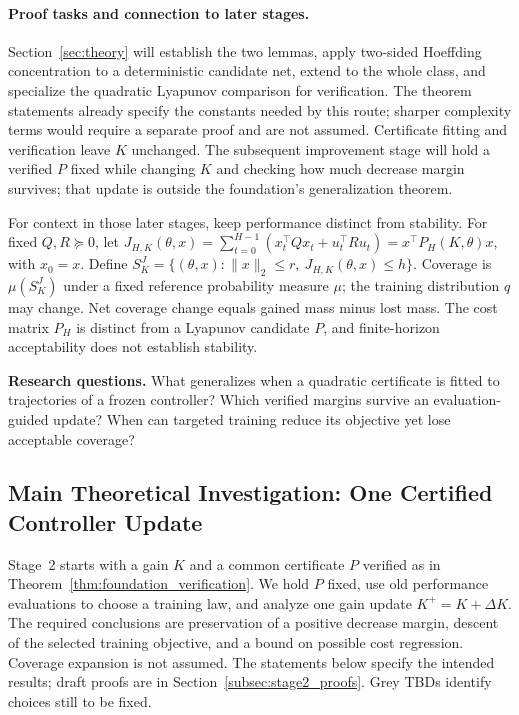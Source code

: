 \paragraph{Proof tasks and connection to later stages.}
Section~\ref{sec:theory} will establish the two lemmas, apply two-sided
Hoeffding concentration to a deterministic candidate net, extend to the
whole class, and specialize the quadratic Lyapunov comparison for verification.
The theorem statements already specify the constants needed by this route;
sharper complexity terms would require a separate proof and are not assumed.
Certificate fitting and verification leave $K$ unchanged. The subsequent
improvement stage will hold a verified $P$ fixed while changing $K$ and
checking how much decrease margin survives; that update is outside the
foundation's generalization theorem.

For context in those later stages, keep performance distinct from stability.
For fixed $Q,R\succeq0$, let
$J_{H,K}(\theta,x)=\sum_{t=0}^{H-1}(x_t^\top Qx_t+u_t^\top Ru_t)
=x^\top P_H(K,\theta)x$, with $x_0=x$.
Define $S_K^J=\{(\theta,x):\|x\|_2\le r,\ J_{H,K}(\theta,x)\le h\}$.
Coverage is $\mu(S_K^J)$ under a fixed reference probability measure $\mu$;
the training distribution $q$ may change. Net coverage change equals gained
mass minus lost mass. The cost matrix $P_H$ is distinct from a Lyapunov
candidate $P$, and finite-horizon acceptability does not establish stability.

\textbf{Research questions.}
What generalizes when a quadratic certificate is fitted to trajectories of a
frozen controller? Which verified margins survive an evaluation-guided update?
When can targeted training reduce its objective yet lose acceptable coverage?

\subsection{Main Theoretical Investigation: One Certified Controller Update}
\label{subsec:stage2_update}
\providecommand{\stagetwotbd}[1]{{\normalfont\color{gray}\textsf{[TBD: #1]}}}

Stage~2 starts with a gain $K$ and a common certificate $P$ verified as in
Theorem~\ref{thm:foundation_verification}. We hold $P$ fixed, use old
performance evaluations to choose a training law, and analyze one gain
update $K^+=K+\Delta K$. The required conclusions are preservation of a
positive decrease margin, descent of the selected training objective, and
a bound on possible cost regression. Coverage expansion is not assumed.
The statements below specify the intended results; draft proofs are in
Section~\ref{subsec:stage2_proofs}. Grey TBDs identify choices still to be fixed.

